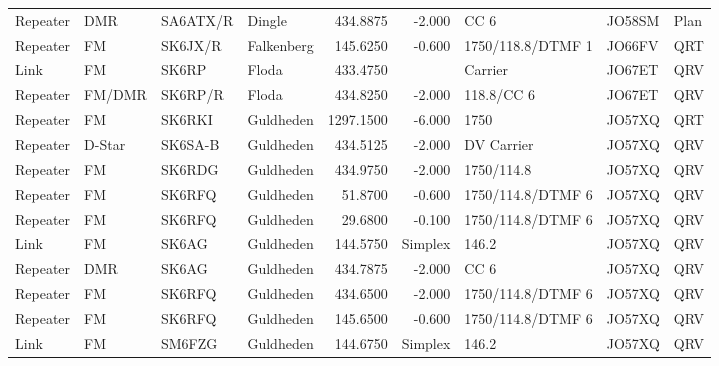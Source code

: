 \begin{landscape}
\begin{longtable}{llllrrlll}
	Repeater          & DMR             & SA6ATX/R & Dingle                &     434.8875 &     -2.000 & CC 6              & JO58SM      & Plan     \\
	Repeater          & FM              & SK6JX/R  & Falkenberg            &     145.6250 &     -0.600 & 1750/118.8/DTMF 1 & JO66FV      & QRT      \\
	Link              & FM              & SK6RP    & Floda                 &     433.4750 &            & Carrier           & JO67ET      & QRV      \\
	Repeater          & FM/DMR          & SK6RP/R  & Floda                 &     434.8250 &     -2.000 & 118.8/CC 6        & JO67ET      & QRV      \\
	Repeater          & FM              & SK6RKI   & Guldheden             &    1297.1500 &     -6.000 & 1750              & JO57XQ      & QRT      \\
	Repeater          & D-Star          & SK6SA-B  & Guldheden             &     434.5125 &     -2.000 & DV Carrier        & JO57XQ      & QRV      \\
	Repeater          & FM              & SK6RDG   & Guldheden             &     434.9750 &     -2.000 & 1750/114.8        & JO57XQ      & QRV      \\
	Repeater          & FM              & SK6RFQ   & Guldheden             &      51.8700 &     -0.600 & 1750/114.8/DTMF 6 & JO57XQ      & QRV      \\
	Repeater          & FM              & SK6RFQ   & Guldheden             &      29.6800 &     -0.100 & 1750/114.8/DTMF 6 & JO57XQ      & QRV      \\
	Link              & FM              & SK6AG    & Guldheden             &     144.5750 &    Simplex & 146.2             & JO57XQ      & QRV      \\
	Repeater          & DMR             & SK6AG    & Guldheden             &     434.7875 &     -2.000 & CC 6              & JO57XQ      & QRV      \\
	Repeater          & FM              & SK6RFQ   & Guldheden             &     434.6500 &     -2.000 & 1750/114.8/DTMF 6 & JO57XQ      & QRV      \\
	Repeater          & FM              & SK6RFQ   & Guldheden             &     145.6500 &     -0.600 & 1750/114.8/DTMF 6 & JO57XQ      & QRV      \\
	Link              & FM              & SM6FZG   & Guldheden             &     144.6750 &    Simplex & 146.2             & JO57XQ      & QRV      \\

\end{longtable}
\end{landscape}
